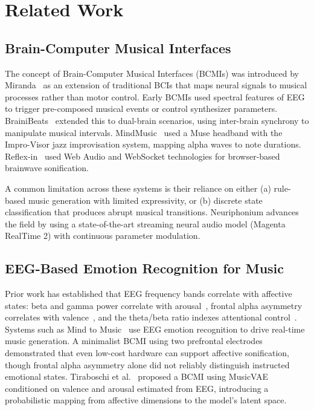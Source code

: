 \documentclass[manuscript,review,anonymous]{acmart}
\begin{document}
\section{Related Work}

\subsection{Brain-Computer Musical Interfaces}

The concept of Brain-Computer Musical Interfaces (BCMIs) was introduced by Miranda~\cite{miranda2010} as an extension of traditional BCIs that maps neural signals to musical processes rather than motor control. Early BCMIs used spectral features of EEG to trigger pre-composed musical events or control synthesizer parameters. BrainiBeats~\cite{brainibeats2023} extended this to dual-brain scenarios, using inter-brain synchrony to manipulate musical intervals. MindMusic~\cite{mindmusic2019} used a Muse headband with the Impro-Visor jazz improvisation system, mapping alpha waves to note durations. Reflex-in~\cite{reflexin2023} used Web Audio and WebSocket technologies for browser-based brainwave sonification.

A common limitation across these systems is their reliance on either (a) rule-based music generation with limited expressivity, or (b) discrete state classification that produces abrupt musical transitions. Neuriphonium advances the field by using a state-of-the-art streaming neural audio model (Magenta RealTime 2) with continuous parameter modulation.

\subsection{EEG-Based Emotion Recognition for Music}

Prior work has established that EEG frequency bands correlate with affective states: beta and gamma power correlate with arousal~\cite{russell1980}, frontal alpha asymmetry correlates with valence~\cite{davidson2004}, and the theta/beta ratio indexes attentional control~\cite{putman2014}. Systems such as Mind to Music~\cite{mindtomusic2024} use EEG emotion recognition to drive real-time music generation. A minimalist BCMI using two prefrontal electrodes~\cite{minimalistbcmi} demonstrated that even low-cost hardware can support affective sonification, though frontal alpha asymmetry alone did not reliably distinguish instructed emotional states. Tiraboschi et al.~\cite{tiraboschi2021} proposed a BCMI using MusicVAE conditioned on valence and arousal estimated from EEG, introducing a probabilistic mapping from affective dimensions to the model's latent space.
\end{document}
